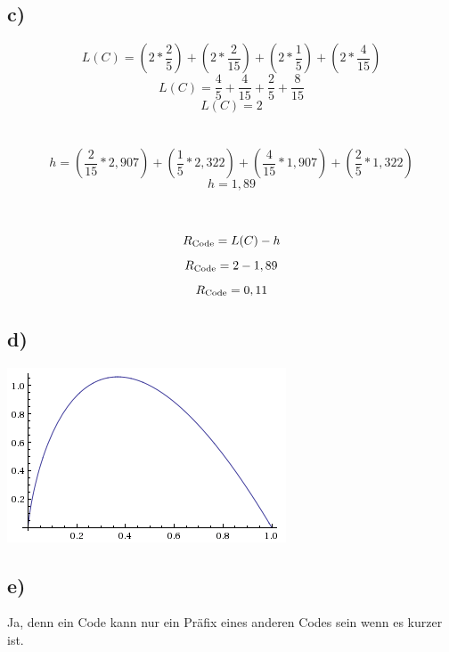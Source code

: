 \documentclass[a4paper,12pt]{scrartcl}
\begin{document}
\subsection{c)}
\begin{displaymath}
L(C) = (2*\frac{2} {5})+(2*\frac{2} {15})+(2*\frac{1} {5})+(2*\frac{4} {15})
\end{displaymath}
\begin{displaymath}
L(C) = \frac{4} {5} + \frac{4} {15} + \frac{2} {5} + \frac{8} {15}
\end{displaymath}
\begin{displaymath}
L(C) = 2
\end{displaymath}
\\\\
\begin{displaymath}
h = (\frac{2} {15}*2,907)+(\frac{1} {5}*2,322)+(\frac{4} {15}*1,907)+(\frac{2} {5}*1,322)
\end{displaymath}
\begin{displaymath}
h = 1,89
\end{displaymath}
\\\\
\begin{displaymath}
R\textsubscript{Code} = L(C) - h
\end{displaymath}
\begin{displaymath}
R\textsubscript{Code} = 2 - 1,89
\end{displaymath}
\begin{displaymath}
R\textsubscript{Code} = 0,11
\end{displaymath}

\subsection{d)}
\begin{center}
\includegraphics{./images/Aufgabe6d}
\end{center}

\subsection{e)}
Ja, denn ein Code kann nur ein Präfix eines anderen Codes sein wenn es kurzer ist.
\end{document}

